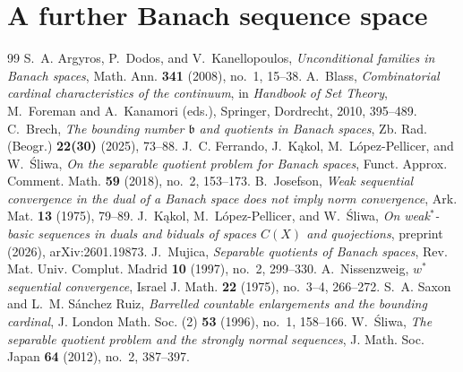 \documentclass[10pt,a4paper]{amsart}
\begin{document}
\section{A further Banach sequence space}\label{sec:sequence-space}


\begin{thebibliography}{99}
 S.~A. Argyros, P.~Dodos, and V.~Kanellopoulos, \emph{Unconditional families in Banach spaces}, Math. Ann. \textbf{341} (2008), no.~1, 15--38.
 A.~Blass, \emph{Combinatorial cardinal characteristics of the continuum}, in \emph{Handbook of Set Theory}, M.~Foreman and A.~Kanamori (eds.), Springer, Dordrecht, 2010, 395--489.
 C.~Brech, \emph{The bounding number $\mathfrak b$ and quotients in Banach spaces}, Zb. Rad. (Beogr.) \textbf{22(30)} (2025), 73--88.
 J.~C. Ferrando, J.~K\k{a}kol, M.~L\'opez-Pellicer, and W.~\'Sliwa, \emph{On the separable quotient problem for Banach spaces}, Funct. Approx. Comment. Math. \textbf{59} (2018), no.~2, 153--173.
 B.~Josefson, \emph{Weak sequential convergence in the dual of a Banach space does not imply norm convergence}, Ark. Mat. \textbf{13} (1975), 79--89.
 J.~K\k{a}kol, M.~L\'opez-Pellicer, and W.~\'Sliwa, \emph{On weak$^*$-basic sequences in duals and biduals of spaces $C(X)$ and quojections}, preprint (2026), arXiv:2601.19873.
 J.~Mujica, \emph{Separable quotients of Banach spaces}, Rev. Mat. Univ. Complut. Madrid \textbf{10} (1997), no.~2, 299--330.
 A.~Nissenzweig, \emph{$w^*$ sequential convergence}, Israel J. Math. \textbf{22} (1975), no.~3--4, 266--272.
 S.~A. Saxon and L.~M. S\'anchez Ruiz, \emph{Barrelled countable enlargements and the bounding cardinal}, J. London Math. Soc. (2) \textbf{53} (1996), no.~1, 158--166.
 W.~\'Sliwa, \emph{The separable quotient problem and the strongly normal sequences}, J. Math. Soc. Japan \textbf{64} (2012), no.~2, 387--397.
\end{thebibliography}
\end{document}

